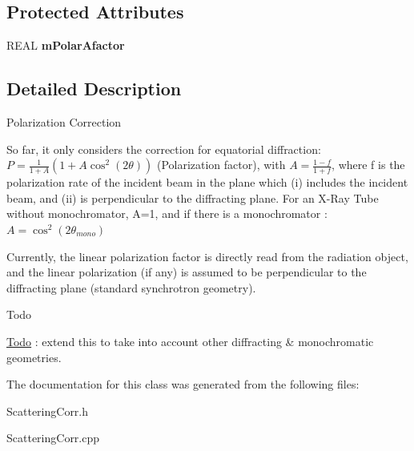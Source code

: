 \subsection*{Protected Attributes}
\begin{DoxyCompactItemize}
\item 
\mbox{\label{class_obj_cryst_1_1_polarization_corr_a8a0115cf6d539ede891056f94b6887cf}} 
R\+E\+AL {\bfseries m\+Polar\+Afactor}
\end{DoxyCompactItemize}


\subsection{Detailed Description}
Polarization Correction

So far, it only considers the correction for equatorial diffraction\+: $ P = \frac{1}{1+A}\left(1+A\cos^2(2\theta)\right) $ (Polarization factor), with $ A = \frac{1-f}{1+f} $, where f is the polarization rate of the incident beam in the plane which (i) includes the incident beam, and (ii) is perpendicular to the diffracting plane. For an X-\/\+Ray Tube without monochromator, A=1, and if there is a monochromator \+: $ A = \cos^2(2\theta_{mono}) $

Currently, the linear polarization factor is directly read from the radiation object, and the linear polarization (if any) is assumed to be perpendicular to the diffracting plane (standard synchrotron geometry).

\begin{DoxyRefDesc}{Todo}
\item[\mbox{\hyperlink{todo__todo000007}{Todo}}]\+: extend this to take into account other diffracting \& monochromatic geometries. \end{DoxyRefDesc}


The documentation for this class was generated from the following files\+:\begin{DoxyCompactItemize}
\item 
Scattering\+Corr.\+h\item 
Scattering\+Corr.\+cpp\end{DoxyCompactItemize}
